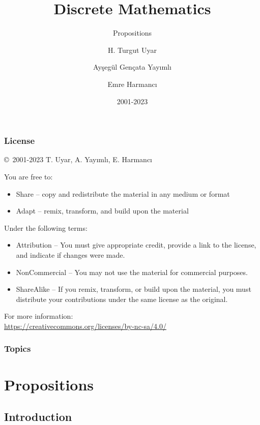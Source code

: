 \documentclass[dvipsnames]{beamer}
\title{Discrete Mathematics}
\subtitle{Propositions}
\author{H. Turgut Uyar \and Ayşegül Gençata Yayımlı \and Emre Harmancı}
\date{2001-2023}
\begin{document}
\begin{frame}
  \titlepage
\end{frame}

\begin{frame}
  \frametitle{License}

  \hfill
  \copyright~2001-2023 T. Uyar, A. Yayımlı, E. Harmancı

  \vfill
  \begin{footnotesize}
    You are free to:
    \begin{itemize}
      \itemsep0em
      \item Share -- copy and redistribute the material in any medium or format
      \item Adapt -- remix, transform, and build upon the material
    \end{itemize}

    Under the following terms:
    \begin{itemize}
      \itemsep0em
      \item Attribution -- You must give appropriate credit, provide a link to
        the license, and indicate if changes were made.

      \item NonCommercial -- You may not use the material for commercial
        purposes.

      \item ShareAlike -- If you remix, transform, or build upon the material,
        you must distribute your contributions under the same license as the
        original.
    \end{itemize}
  \end{footnotesize}

  \begin{small}
    For more information:\\
    \url{https://creativecommons.org/licenses/by-nc-sa/4.0/}
  \end{small}
\end{frame}

\begin{frame}
  \frametitle{Topics}
  \tableofcontents
\end{frame}

\section{Propositions}

\subsection{Introduction}
\end{document}
